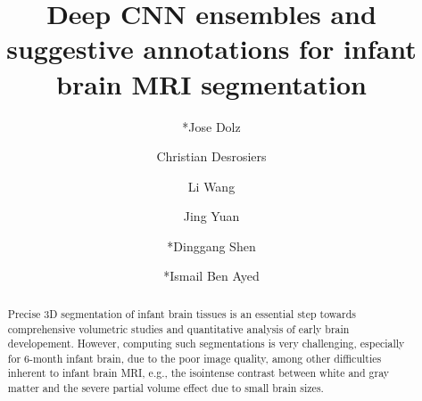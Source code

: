 \documentclass[twoside,espcrc2]{elsarticle}
\begin{document}
\begin{frontmatter}



\title{Deep CNN ensembles and suggestive annotations for infant brain MRI segmentation}


\author[LIVIA]{*Jose Dolz}
\author[LIVIA]{Christian Desrosiers}
\author[NC]{Li Wang}
\author[XIDIAN]{Jing Yuan}
\author[NC,KU]{*Dinggang Shen}
\author[LIVIA]{*Ismail Ben Ayed}

\address[LIVIA]{Ecole de Technologie Superieure (ETS), University of Quebec, Montreal, QC, Canada}
\address[XIDIAN]{Xidian University, School of Mathematics and Statistics, Xi'an, China}
\address[NC]{Department of Radiology and BRIC, University of North Carolina at Chapel Hill, NC 27599, USA}
\address[KU]{Department of Brain and Cognitive Engineering, Korea University, Seoul 02841, Republic of Korea}



%
%
%


\begin{abstract}

Precise 3D segmentation of infant brain tissues is an essential step towards comprehensive volumetric studies and quantitative analysis of early brain developement. However, computing such segmentations is very challenging, especially for 6-month infant brain, due to the poor image quality, among other difficulties inherent to infant brain MRI, e.g., the isointense contrast between white and gray matter and the severe partial volume effect due to small brain sizes. 


\end{abstract}
\end{frontmatter}
\end{document}
